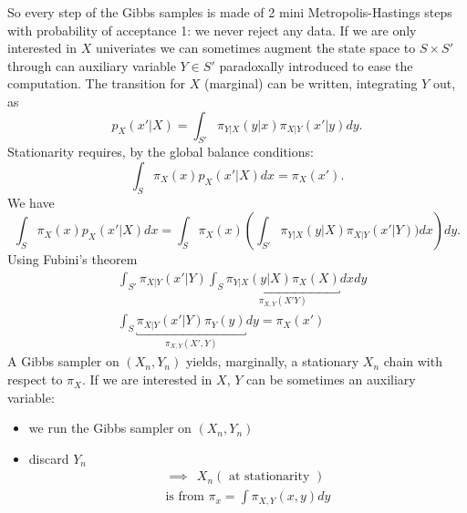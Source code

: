 \documentclass{article}
\begin{document}
So every step of the Gibbs samples is made of 2 mini Metropolis-Hastings steps with probability of acceptance 1: we never reject any data. If we are only interested in $X$ univeriates we can sometimes augment the state space to $S\times S'$ through can auxiliary variable $Y\in S'$ paradoxally introduced to ease the computation. The transition for $X$ (marginal) can be written, integrating $Y$ out, as \[
p_X(x'|X)=\int_{S'}\pi_{Y|X}(y|x)\pi_{X|Y}(x'|y)dy.
\]
Stationarity requires, by the global balance conditions:
\[
\int_S\pi_X(x)p_X(x'|X)dx=\pi_X(x').
\]
We have
\[
\int_{S}\pi_{X}(x)p_X(x'|X)dx=\int_S\pi_X(x)\left(\int_{S'}\pi_{Y|X}(y|X)\pi_{X|Y}(x'|Y))dx\right)dy.
\]
Using Fubini's theorem
\begin{align*}
&\int_{S'} \pi_{X|Y}(x'|Y)\int_S\underbracket{\pi_{Y|X}(y|X)\pi_X(X)}_{\pi_{X,Y}(X'Y)}dxdy\\
&\int_S \underbracket{\pi_{X|Y}(x'|Y)\pi_{Y}(y)}_{\pi_{X,Y}(X',Y)}dy=\pi_X(x')
\end{align*}
A Gibbs sampler on $(X_n,Y_n)$ yields, marginally, a stationary $X_n$ chain with respect to $\pi_X$.
If we are interested in $X$, $Y$ can be sometimes an auxiliary variable: \\
\begin{itemize}
    \item we run the Gibbs sampler on $(X_n, Y_n)$
    \item discard $Y_n$
    \begin{equation*}
    \begin{split}
        \implies \ \ X_n (\text{ at stationarity })\\
        \text{is from }\pi_x = \int \pi_{X,Y}(x,y)dy
    \end{split}
    \end{equation*}
\end{itemize}
\end{document}
